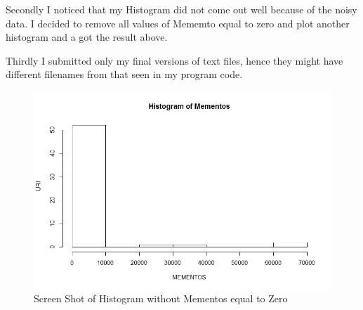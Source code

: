 \documentclass{article}
\begin{document}
Secondly I noticed that my Histogram did not come out well because of the noisy data. I decided to remove all values of Mememto equal to zero and plot another histogram and a got the result above.

Thirdly I submitted only my final versions of text files, hence they might have  different filenames from that seen in my program code.

\begin{figure}
    \centering
    \includegraphics[width=5.0in]{Histogram_memento}
    \caption{Screen Shot of Histogram without Mementos equal to Zero}
    \label{fig:9}
\end{figure}



\end{document}

